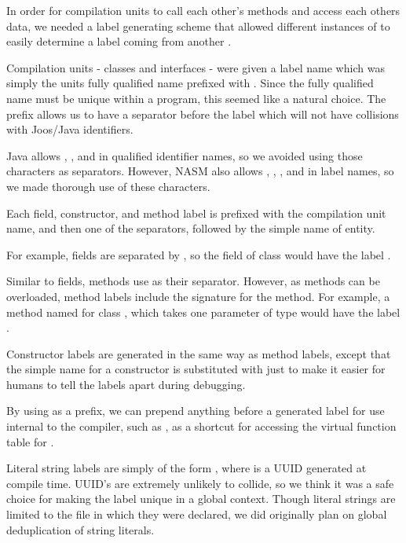 \documentclass[pdftex,10pt,a4paper]{article}
\begin{document}
In order for compilation units to call each other's methods and access
each others data, we needed a label generating scheme that allowed
different instances of  to easily determine a label
coming from another .

Compilation units - classes and interfaces - were given a label name
which was simply the units fully qualified name prefixed with
. Since the fully qualified name must be unique within a
program, this seemed like a natural choice. The  prefix allows
us to have a separator before the label which will not have collisions
with Joos/Java identifiers.

Java allows \ttt{\$}, \ttt{\_}, and  in qualified identifier
names, so we avoided using those characters as separators. However,
NASM also allows \ttt{\#}, , \ttt{~}, and  in label
names, so we made thorough use of these characters.

Each field, constructor, and method label is prefixed with the
compilation unit name, and then one of the separators, followed by the
simple name of entity.

For example, fields are separated by , so the  field
of  class would have the label
.

Similar to fields, methods use \ttt{~} as their separator. However, as
methods can be overloaded, method labels include the signature for the
method. For example, a method named  for class
, which takes one parameter of type
 would have the label
.

Constructor labels are generated in the same way as method labels,
except that the simple name for a constructor is substituted with
 just to make it easier for humans to tell the labels apart
during debugging.

By using  as a prefix, we can prepend anything before a
generated label for use internal to the compiler, such as
, as a shortcut for accessing the
virtual function table for .

Literal string labels are simply of the form , where
 is a UUID generated at compile time. UUID's are extremely
unlikely to collide, so we think it was a safe choice for making the
label unique in a global context. Though literal strings are limited
to the file in which they were declared, we did originally plan on
global deduplication of string literals.
\end{document}
